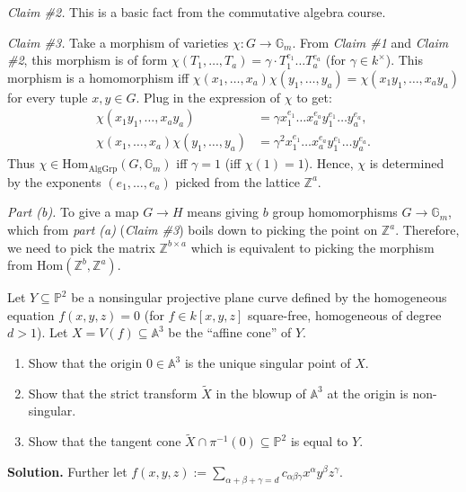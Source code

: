 \documentclass{template}
\begin{document}
\textit{Claim \#2.} This is a basic fact from the commutative algebra course.

\textit{Claim \#3.} Take a morphism of varieties $\chi: G \to \mathbb{G}_m$.
From \textit{Claim \#1} and \textit{Claim \#2}, this morphism is of form
$\chi(T_1,\dots,T_a) = \gamma \cdot T_1^{e_1}\dots T_a^{e_a}$ (for $\gamma \in
k^{\times}$). This morphism is a homomorphism iff
$\chi(x_1,\dots,x_a)\chi(y_1,\dots,y_a) = \chi(x_1y_1,\dots,x_ay_a)$ for every
tuple $x,y \in G$. Plug in the expression of $\chi$ to get:
\begin{align*}
    \chi(x_1y_1,\dots,x_ay_a) &= \gamma x_1^{e_1}\dots x_a^{e_a}y_1^{e_1}\dots y_a^{e_a}, \\
    \chi(x_1,\dots,x_a)\chi(y_1,\dots,y_a) &= \gamma^2x_1^{e_1}\dots x_a^{e_a}y_1^{e_1}\dots y_a^{e_a}.
\end{align*}
Thus $\chi \in \text{Hom}_{\text{AlgGrp}}(G,\mathbb{G}_m)$ iff $\gamma=1$ (iff
$\chi(1)=1$). Hence, $\chi$ is determined by the exponents $(e_1,\dots,e_a)$
picked from the lattice $\mathbb{Z}^a$.

\textcolor{blue!70!black}{\textit{Part (b).}} To give a map $G \to H$ means
giving $b$ group homomorphisms $G \to \mathbb{G}_m$, which from \textit{part
(a)} (\textit{Claim \#3}) boils down to picking the point on $\mathbb{Z}^a$.
Therefore, we need to pick the matrix $\mathbb{Z}^{b \times a}$ which is 
equivalent to picking the morphism from $\text{Hom}(\mathbb{Z}^b, \mathbb{Z}^a)$.

\begin{problem}[Exercise 3]
    Let $Y \subseteq \mathbb{P}^2$ be a nonsingular projective plane curve
    defined by the homogeneous equation $f(x,y,z)=0$ (for $f \in k[x,y,z]$
    square-free, homogeneous of degree $d>1$). Let $X=V(f) \subseteq
    \mathbb{A}^3$ be the ``affine cone'' of $Y$.
    \begin{enumerate}
        \item[(a)] Show that the origin $0 \in \mathbb{A}^3$ is the unique singular point of $X$.
        \item[(b)] Show that the strict transform $\widetilde{X}$ in the blowup of $\mathbb{A}^3$ at the origin is non-singular.
        \item[(c)] Show that the tangent cone $\widetilde{X} \cap \pi^{-1}(0) \subseteq \mathbb{P}^2$ is equal to $Y$.  
    \end{enumerate}
\end{problem}

\textbf{Solution.} Further let $f(x,y,z):=\sum_{\alpha+\beta+\gamma=d}c_{\alpha\beta\gamma}x^{\alpha}y^{\beta}z^{\gamma}$.
\end{document}

